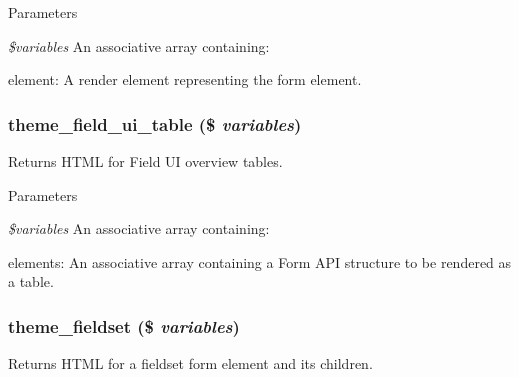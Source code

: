 \begin{DoxyParams}{Parameters}
\item[{\em \$variables}]An associative array containing:
\begin{DoxyItemize}
\item element: A render element representing the form element. 
\end{DoxyItemize}\end{DoxyParams}
\hypertarget{group__themeable_gae4055bc790361b3cb3e6edd36712243d}{
\subsubsection[{theme\_\-field\_\-ui\_\-table}]{\setlength{\rightskip}{0pt plus 5cm}theme\_\-field\_\-ui\_\-table (\$ {\em variables})}}
\label{group__themeable_gae4055bc790361b3cb3e6edd36712243d}
Returns HTML for Field UI overview tables.


\begin{DoxyParams}{Parameters}
\item[{\em \$variables}]An associative array containing:
\begin{DoxyItemize}
\item elements: An associative array containing a Form API structure to be rendered as a table. 
\end{DoxyItemize}\end{DoxyParams}
\hypertarget{group__themeable_gaf7f2e634c1a429fd6a1c176ff2be91a9}{
\subsubsection[{theme\_\-fieldset}]{\setlength{\rightskip}{0pt plus 5cm}theme\_\-fieldset (\$ {\em variables})}}
\label{group__themeable_gaf7f2e634c1a429fd6a1c176ff2be91a9}
Returns HTML for a fieldset form element and its children.


